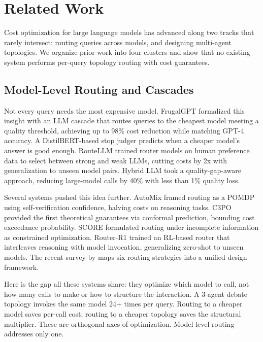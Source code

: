 \section{Related Work}\label{related-work}

Cost optimization for large language models has advanced along two tracks that rarely intersect: routing queries across models, and designing multi-agent topologies. We organize prior work into four clusters and show that no existing system performs per-query topology routing with cost guarantees.

\subsection{Model-Level Routing and Cascades}\label{model-level-routing-and-cascades}

Not every query needs the most expensive model. FrugalGPT \cite{chen_2023_frugalgpt} formalized this insight with an LLM cascade that routes queries to the cheapest model meeting a quality threshold, achieving up to 98\% cost reduction while matching GPT-4 accuracy. A DistilBERT-based stop judger predicts when a cheaper model's answer is good enough. RouteLLM \cite{ong_2024} trained router models on human preference data to select between strong and weak LLMs, cutting costs by 2x with generalization to unseen model pairs. Hybrid LLM \cite{ding_2024} took a quality-gap-aware approach, reducing large-model calls by 40\% with less than 1\% quality loss.

Several systems pushed this idea further. AutoMix \cite{aggarwal_2024} framed routing as a POMDP using self-verification confidence, halving costs on reasoning tasks. C3PO \cite{valk_2025} provided the first theoretical guarantees via conformal prediction, bounding cost exceedance probability. SCORE \cite{score_2025} formulated routing under incomplete information as constrained optimization. Router-R1 \cite{zhang_2025_routerr1} trained an RL-based router that interleaves reasoning with model invocation, generalizing zero-shot to unseen models. The recent survey by \cite{survey_routing_2025} maps six routing strategies into a unified design framework.

Here is the gap all these systems share: they optimize which model to call, not how many calls to make or how to structure the interaction. A 3-agent debate topology invokes the same model 24+ times per query. Routing to a cheaper model saves per-call cost; routing to a cheaper topology saves the structural multiplier. These are orthogonal axes of optimization. Model-level routing addresses only one.

